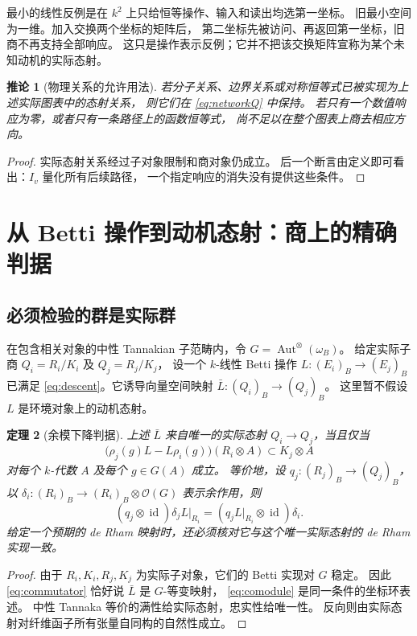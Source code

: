 \documentclass[11pt,a4paper]{ctexart}
\theoremstyle{cnplain}
\newtheorem{theorem}{定理}[section]
\newtheorem{corollary}[theorem]{推论}
\theoremstyle{definition}
\theoremstyle{remark}
\newcommand{\id}{\operatorname{id}}
\begin{document}
最小的线性反例是在 $k^2$ 上只给恒等操作、输入和读出均选第一坐标。
旧最小空间为一维。加入交换两个坐标的矩阵后，
第二坐标先被访问、再返回第一坐标，旧商不再支持全部响应。
这只是操作表示反例；它并不把该交换矩阵宣称为某个未知动机的实际态射。

\begin{corollary}[物理关系的允许用法]
若分子关系、边界关系或对称恒等式已被实现为上述实际图表中的态射关系，
则它们在 \eqref{eq:networkQ} 中保持。
若只有一个数值响应为零，或者只有一条路径上的函数恒等式，
尚不足以在整个图表上商去相应方向。
\end{corollary}
\begin{proof}
实际态射关系经过子对象限制和商对象仍成立。
后一个断言由定义即可看出：$I_v$ 量化所有后续路径，
一个指定响应的消失没有提供这些条件。
\end{proof}

\section{从 Betti 操作到动机态射：商上的精确判据}
\subsection{必须检验的群是实际群}
在包含相关对象的中性 Tannakian 子范畴内，令
$G=\operatorname{Aut}^{\otimes}(\omega_B)$。
给定实际子商 $Q_i=R_i/K_i$ 及 $Q_j=R_j/K_j$，
设一个 $k$-线性 Betti 操作 $L:(E_i)_B\to(E_j)_B$ 已满足
\eqref{eq:descent}。它诱导向量空间映射 $\bar L:(Q_i)_B\to(Q_j)_B$。
这里暂不假设 $L$ 是环境对象上的动机态射。

\begin{theorem}[余模下降判据]\label{thm:intertwine}
上述 $\bar L$ 来自唯一的实际态射 $Q_i\to Q_j$，当且仅当
\begin{equation}\label{eq:commutator}
 \bigl(\rho_j(g)L-L\rho_i(g)\bigr)(R_i\otimes A)
       \subset K_j\otimes A
\end{equation}
对每个 $k$-代数 $A$ 及每个 $g\in G(A)$ 成立。
等价地，设 $q_j:(R_j)_B\to(Q_j)_B$，以
$\delta_i:(R_i)_B\to(R_i)_B\otimes\mathcal O(G)$ 表示余作用，则
\begin{equation}\label{eq:comodule}
 (q_j\otimes\id)\delta_j L|_{R_i}
       =(q_jL|_{R_i}\otimes\id)\delta_i.
\end{equation}
给定一个预期的 de Rham 映射时，还必须核对它与这个唯一实际态射的
de Rham 实现一致。
\end{theorem}
\begin{proof}
由于 $R_i,K_i,R_j,K_j$ 为实际子对象，它们的 Betti 实现对 $G$ 稳定。
因此 \eqref{eq:commutator} 恰好说 $\bar L$ 是 $G$-等变映射，
\eqref{eq:comodule} 是同一条件的坐标环表述。
中性 Tannaka 等价的满性给实际态射，忠实性给唯一性。
反向则由实际态射对纤维函子所有张量自同构的自然性成立。
\end{proof}
\end{document}
